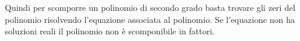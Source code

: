 
Quindi per scomporre un polinomio di secondo grado basta trovare gli 
zeri del polinomio risolvendo l'equazione associata al polinomio.
Se l'equazione non ha soluzioni reali il polinomio non è scomponibile in 
fattori.


